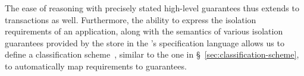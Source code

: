 The ease of reasoning with precisely stated high-level guarantees thus
extends to transactions as well. Furthermore, the ability to express
the isolation requirements of an application, along with the semantics
of various isolation guarantees provided by the store in the \name's
specification language allows us to define a classification
scheme~\cite{pldi15}, similar to the one in
\S~\ref{sec:classification-scheme}, to automatically map requirements
to guarantees.
